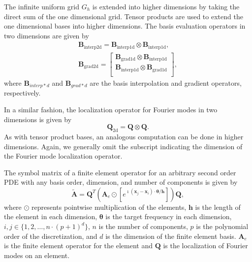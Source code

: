 \documentclass[review]{siamart190516}
\begin{document}
The infinite uniform grid $G_h$ is extended into higher dimensions by taking the direct sum of the one dimensional grid.
Tensor products are used to extend the one dimensional bases into higher dimensions.
The basis evaluation operators in two dimensions are given by
\begin{equation}
\begin{split}
\mathbf{B}_{\text{interp2d}} = \mathbf{B}_{\text{interp1d}} \otimes \mathbf{B}_{\text{interp1d}}, \\
\mathbf{B}_{\text{grad2d}} =
\begin{bmatrix}
    \mathbf{B}_{\text{grad1d}} \otimes \mathbf{B}_{\text{interp1d}} \\
    \mathbf{B}_{\text{interp1d}} \otimes \mathbf{B}_{\text{grad1d}} \\
\end{bmatrix},
\end{split}
\end{equation}
where $\mathbf{B}_{interp*d}$ and $\mathbf{B}_{grad*d}$ are the basis interpolation and gradient operators, respectively.

In a similar fashion, the localization operator for Fourier modes in two dimensions is given by
\begin{equation}
\mathbf{Q}_{\text{2d}} = \mathbf{Q} \otimes \mathbf{Q}.
\end{equation}
As with tensor product bases, an analogous computation can be done in higher dimensions.
Again, we generally omit the subscript indicating the dimension of the Fourier mode localization operator.

\begin{definition}
The symbol matrix of a finite element operator for an arbitrary second order PDE with any basis order, dimension, and number of components is given by
\begin{equation}\label{symbolhighorder}
\tilde{\mathbf{A}} = \mathbf{Q}^T \left( \mathbf{A}_e \odot \left[ e^{\imath \left( \mathbf{x}_j - \mathbf{x}_i \right) \cdot \boldsymbol{\theta} / \mathbf{h}} \right] \right) \mathbf{Q},
\end{equation}
where $\odot$ represents pointwise multiplication of the elements, $\mathbf{h}$ is the length of the element in each dimension, $\boldsymbol{\theta}$ is the target frequency in each dimension, $i, j \in \lbrace 1, 2, \dots, n \cdot \left( p + 1 \right)^d \rbrace$, $n$ is the number of components, $p$ is the polynomial order of the discretization, and $d$ is the dimension of the finite element basis.
$\mathbf{A}_e$ is the finite element operator for the element and $\mathbf{Q}$ is the localization of Fourier modes on an element.
\end{definition}\label{def:high_order_symbol}
\end{document}
